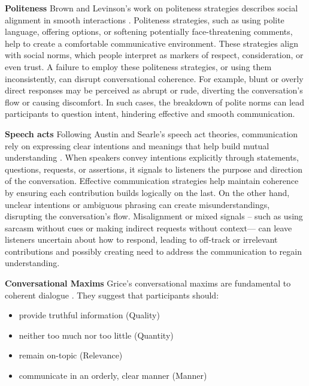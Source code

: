 \documentclass[12pt]{report}
\begin{document}
\par{\textbf{Politeness}
Brown and Levinson’s work on politeness strategies describes social alignment in smooth interactions \cite{brown1987politeness}. Politeness strategies, such as using polite language, offering options, or softening potentially face-threatening comments, help to create a comfortable communicative environment. These strategies align with social norms, which people interpret as markers of respect, consideration, or even trust. A failure to employ these politeness strategies, or using them inconsistently, can disrupt conversational coherence. For example, blunt or overly direct responses may be perceived as abrupt or rude, diverting the conversation's flow or causing discomfort. In such cases, the breakdown of polite norms can lead participants to question intent, hindering effective and smooth communication.


\par{\textbf{Speech acts}}
Following Austin and Searle's speech act theories, communication rely on expressing clear intentions and meanings that help build mutual understanding \cite{austin1962how} \cite{searle1969speech}. When speakers convey intentions explicitly through statements, questions, requests, or assertions, it signals to listeners the purpose and direction of the conversation. Effective communication strategies help maintain coherence by ensuring each contribution builds logically on the last. On the other hand, unclear intentions or ambiguous phrasing can create misunderstandings, disrupting the conversation's flow. Misalignment or mixed signals – such as using sarcasm without cues or making indirect requests without context— can leave listeners uncertain about how to respond, leading to off-track or irrelevant contributions and possibly creating need to address the communication to regain understanding.

\par{\textbf{Conversational Maxims}}
Grice’s conversational maxims are fundamental to coherent dialogue \cite{grice1975logic}.
They suggest that participants should:

\begin{itemize}
\item
provide truthful information (Quality)
\item
neither too much nor too little (Quantity)
\item
remain on-topic (Relevance)
\item
communicate in an orderly, clear manner (Manner)
\end{itemize}

}
\end{document}

